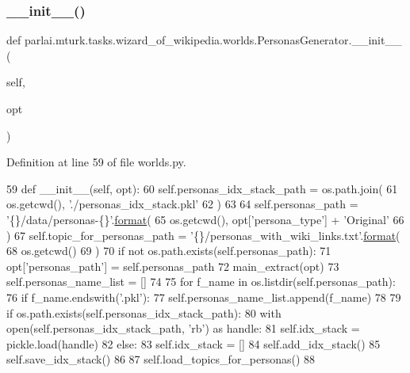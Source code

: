 \subsubsection{\texorpdfstring{\+\_\+\+\_\+init\+\_\+\+\_\+()}{\_\_init\_\_()}}
{\footnotesize\ttfamily def parlai.\+mturk.\+tasks.\+wizard\+\_\+of\+\_\+wikipedia.\+worlds.\+Personas\+Generator.\+\_\+\+\_\+init\+\_\+\+\_\+ (\begin{DoxyParamCaption}\item[{}]{self,  }\item[{}]{opt }\end{DoxyParamCaption})}



Definition at line 59 of file worlds.\+py.


\begin{DoxyCode}
59     \textcolor{keyword}{def }\_\_init\_\_(self, opt):
60         self.personas\_idx\_stack\_path = os.path.join(
61             os.getcwd(), \textcolor{stringliteral}{'./personas\_idx\_stack.pkl'}
62         )
63 
64         self.personas\_path = \textcolor{stringliteral}{'\{\}/data/personas-\{\}'}.\hyperlink{namespaceparlai_1_1chat__service_1_1services_1_1messenger_1_1shared__utils_a32e2e2022b824fbaf80c747160b52a76}{format}(
65             os.getcwd(), opt[\textcolor{stringliteral}{'persona\_type'}] + \textcolor{stringliteral}{'Original'}
66         )
67         self.topic\_for\_personas\_path = \textcolor{stringliteral}{'\{\}/personas\_with\_wiki\_links.txt'}.\hyperlink{namespaceparlai_1_1chat__service_1_1services_1_1messenger_1_1shared__utils_a32e2e2022b824fbaf80c747160b52a76}{format}(
68             os.getcwd()
69         )
70         \textcolor{keywordflow}{if} \textcolor{keywordflow}{not} os.path.exists(self.personas\_path):
71             opt[\textcolor{stringliteral}{'personas\_path'}] = self.personas\_path
72             main\_extract(opt)
73         self.personas\_name\_list = []
74 
75         \textcolor{keywordflow}{for} f\_name \textcolor{keywordflow}{in} os.listdir(self.personas\_path):
76             \textcolor{keywordflow}{if} f\_name.endswith(\textcolor{stringliteral}{'.pkl'}):
77                 self.personas\_name\_list.append(f\_name)
78 
79         \textcolor{keywordflow}{if} os.path.exists(self.personas\_idx\_stack\_path):
80             with open(self.personas\_idx\_stack\_path, \textcolor{stringliteral}{'rb'}) \textcolor{keyword}{as} handle:
81                 self.idx\_stack = pickle.load(handle)
82         \textcolor{keywordflow}{else}:
83             self.idx\_stack = []
84             self.add\_idx\_stack()
85             self.save\_idx\_stack()
86 
87         self.load\_topics\_for\_personas()
88 
\end{DoxyCode}


